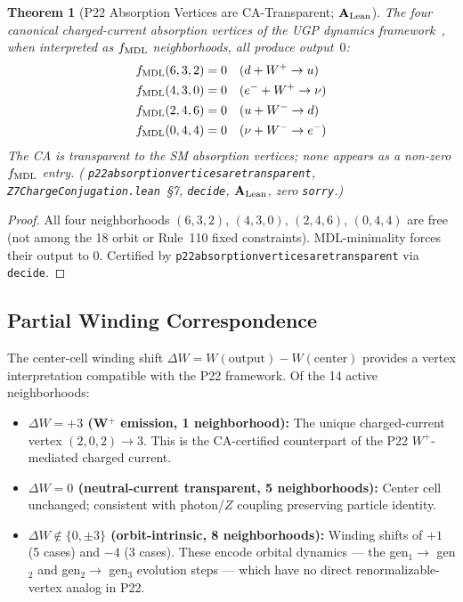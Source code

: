 \documentclass[11pt]{article}
\newtheorem{theorem}{Theorem}[section]
\theoremstyle{remark}
\newcommand{\lean}[1]{%
  \penalty-100
  \begingroup\def\_{\textunderscore\allowbreak}\texttt{#1}\endgroup}
\newcommand{\CatAL}{\ensuremath{\textbf{A}_{\rm Lean}}}
\begin{document}
\begin{theorem}[P22 Absorption Vertices are CA-Transparent; $\CatAL$]
\label{thm:p22_transparent}
The four canonical charged-current absorption vertices of the
UGP dynamics framework~\cite{Spivack2026_UGPDynamics}, when interpreted
as $f_{\rm MDL}$ neighborhoods, all produce output~$0$:
\begin{align}
  f_{\rm MDL}(6, 3, 2) &= 0 \quad (d + W^+ \to u)
  \label{eq:p22_t1}\\
  f_{\rm MDL}(4, 3, 0) &= 0 \quad (e^- + W^+ \to \nu)
  \label{eq:p22_t2}\\
  f_{\rm MDL}(2, 4, 6) &= 0 \quad (u + W^- \to d)
  \label{eq:p22_t3}\\
  f_{\rm MDL}(0, 4, 4) &= 0 \quad (\nu + W^- \to e^-)
  \label{eq:p22_t4}
\end{align}
The CA is transparent to the SM absorption vertices; none appears as
a non-zero $f_{\rm MDL}$ entry.
(\lean{p22\_absorption\_vertices\_are\_transparent},
\texttt{Z7ChargeConjugation.lean}~\S7,
\lean{decide}, $\CatAL$, zero \texttt{sorry}.)
\end{theorem}

\begin{proof}
All four neighborhoods $(6,3,2)$, $(4,3,0)$, $(2,4,6)$, $(0,4,4)$ are
free (not among the 18 orbit or Rule~110 fixed constraints).
MDL-minimality forces their output to $0$.
Certified by \lean{p22\_absorption\_vertices\_are\_transparent}
via \lean{decide}.
\end{proof}

\subsection{Partial Winding Correspondence}
\label{sec:winding_corr}

The center-cell winding shift $\Delta W = W(\text{output}) - W(\text{center})$
provides a vertex interpretation compatible with the P22 framework.
Of the 14 active neighborhoods:
\begin{itemize}[nosep,leftmargin=1.5em]
\item \textbf{$\Delta W = +3$ (W$^+$ emission, 1 neighborhood):}
  The unique charged-current vertex $(2,0,2) \to 3$.
  This is the CA-certified counterpart of the P22 $W^+$-mediated
  charged current.
\item \textbf{$\Delta W = 0$ (neutral-current transparent, 5 neighborhoods):}
  Center cell unchanged; consistent with photon/$Z$ coupling
  preserving particle identity.
\item \textbf{$\Delta W \notin \{0, \pm 3\}$ (orbit-intrinsic, 8 neighborhoods):}
  Winding shifts of $+1$ (5 cases) and $-4$ (3 cases).
  These encode orbital dynamics --- the gen$_1 \to$ gen$_2$ and
  gen$_2 \to$ gen$_3$ evolution steps --- which have no direct
  renormalizable-vertex analog in P22.
\end{itemize}
\end{document}
